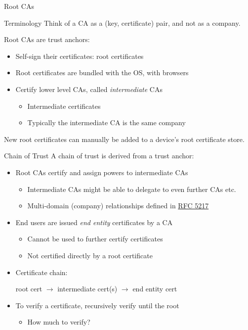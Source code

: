 \begin{frame}{Root CAs}
  \begin{block}{Terminology}
    Think of a CA as a (key, certificate) pair, and not as a company.
  \end{block}

  \pause
  Root CAs are trust anchors:
  \begin{itemize}[<+(1)->]
    \item Self-sign their certificates: root certificates
    \item Root certificates are bundled with the OS, with browsers
    \item Certify lower level CAs, called \emph{intermediate} CAs
    \begin{itemize}
      \item Intermediate certificates
      \item Typically the intermediate CA is the same company
    \end{itemize}
  \end{itemize}

  \pause
  New root certificates can manually be added to a device's root certificate store.
\end{frame}

\begin{frame}{Chain of Trust}
  A chain of trust is derived from a trust anchor:
  \begin{itemize}[<+(1)->]
    \item Root CAs certify and assign powers to intermediate CAs
    \begin{itemize}
      \item Intermediate CAs might be able to delegate to even further CAs etc.
      \item Multi-domain (company) relationships defined in \href{https://datatracker.ietf.org/doc/html/rfc5217}{RFC 5217}
    \end{itemize}
    \item End users are issued \emph{end entity} certificates by a CA
    \begin{itemize}
      \item Cannot be used to further certify certificates
      \item Not certified directly by a root certificate
    \end{itemize}
    \item Certificate chain:
    \begin{center}
      root cert $\to$ intermediate cert(s) $\to$ end entity cert
    \end{center}
    \vspace*{1em}
    \item To verify a certificate, recursively verify until the root
    \begin{itemize}[<+(1)->]
      \item How much to verify?
    \end{itemize}
  \end{itemize}
\end{frame}

